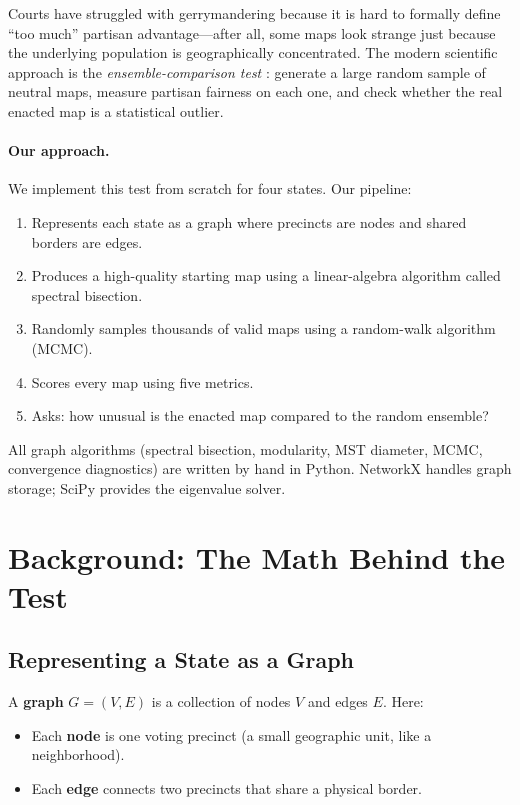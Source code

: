 \documentclass[11pt]{article}
\begin{document}
Courts have struggled with gerrymandering because it is hard to formally
define ``too much'' partisan advantage---after all, some maps look
strange just because the underlying population is geographically
concentrated. The modern scientific approach is the
\emph{ensemble-comparison test} \cite{deford2021}: generate a large
random sample of neutral maps, measure partisan fairness on each one,
and check whether the real enacted map is a statistical outlier.

\paragraph{Our approach.} We implement this test from scratch for
four states. Our pipeline:
\begin{enumerate}
  \item Represents each state as a graph where precincts are nodes and
    shared borders are edges.
  \item Produces a high-quality starting map using a linear-algebra
    algorithm called spectral bisection.
  \item Randomly samples thousands of valid maps using a random-walk
    algorithm (MCMC).
  \item Scores every map using five metrics.
  \item Asks: how unusual is the enacted map compared to the
    random ensemble?
\end{enumerate}

All graph algorithms (spectral bisection, modularity, MST diameter,
MCMC, convergence diagnostics) are written by hand in Python.
NetworkX handles graph storage; SciPy provides the eigenvalue solver.

\section{Background: The Math Behind the Test}
\label{sec:bg}

\subsection{Representing a State as a Graph}

A \textbf{graph} $G = (V, E)$ is a collection of nodes $V$ and edges
$E$. Here:
\begin{itemize}
  \item Each \textbf{node} is one voting precinct (a small geographic
    unit, like a neighborhood).
  \item Each \textbf{edge} connects two precincts that share a physical
    border.
\end{itemize}
\end{document}

